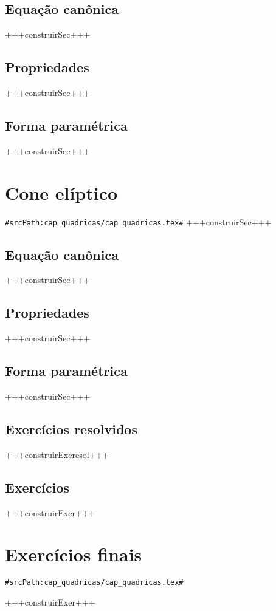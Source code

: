 \subsection{Equação canônica}
+++construirSec+++

\subsection{Propriedades}
+++construirSec+++

\subsection{Forma paramétrica}
+++construirSec+++

\section{Cone elíptico}
\verb+#srcPath:cap_quadricas/cap_quadricas.tex#+
+++construirSec+++

\subsection{Equação canônica}
+++construirSec+++

\subsection{Propriedades}
+++construirSec+++

\subsection{Forma paramétrica}
+++construirSec+++




\subsection*{Exercícios resolvidos}
+++construirExeresol+++

\subsection*{Exercícios}
+++construirExer+++












\section{Exercícios finais}
\verb+#srcPath:cap_quadricas/cap_quadricas.tex#+


+++construirExer+++


